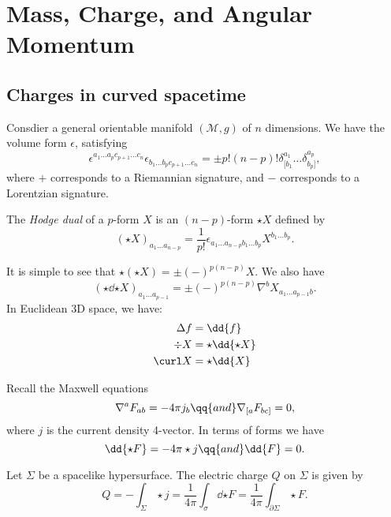 \documentclass{jknotes}
\begin{document}
\section{Mass, Charge, and Angular Momentum}
\subsection{Charges in curved spacetime}
Consdier a general orientable manifold \((\mathcal{M},g)\) of \(n\) dimensions. We have the volume form \(\epsilon\), satisfying
\begin{equation}
    \epsilon^{a_1\dots a_p c_{p+1} \dots c_n}\epsilon_{b_1\dots b_p c_{p+1} \dots c_n}
    = \pm p!(n-p)! \delta^{a_1}_{[b_1} \dots \delta^{a_p}_{b_p]},
\end{equation}
where \(+\) corresponds to a Riemannian signature, and \(-\) corresponds to a Lorentzian signature.
\begin{defn}
    The \emph{Hodge dual} of a \(p\)-form \(X\) is an \((n-p)\)-form \(\star X\) defined by
    \begin{equation}
        (\star X)_{a_1\dots a_{n-p}} = \frac{1}{p!}\epsilon_{a_1\dots a_{n-p} b_1\dots b_p} X^{b_1\dots b_p}.
    \end{equation}
\end{defn}
It is simple to see that \(\star(\star X) = \pm (-)^{p(n-p)}X\). We also have 
\begin{equation}
    (\star \dd{\star X})_{a_1\dots a_{p-1}} = \pm (-)^{p(n-p)} \nabla^b X_{a_1\dots a_{p-1} b}.
\end{equation}
In Euclidean 3D space, we have:
\begin{align}
    \Delta f &= \dd{f} \\
    \div X &= \star\dd{\star X} \\
    \curl X &= \star\dd{X}
\end{align}

Recall the Maxwell equations
\begin{equation}
    \nabla^aF_{ab} = -4\pi j_b \qq{and} \nabla_{[a}F_{bc]} = 0,
\end{equation}
where \(j\) is the current density 4-vector. In terms of forms we have
\begin{equation}
    \dd{\star F} = -4\pi \star j \qq{and} \dd{F} = 0.
\end{equation}

\begin{defn}
    Let \(\Sigma\) be a spacelike hypersurface. The electric charge \(Q\) on \(\Sigma\) is given by
    \begin{equation}
        Q = -\int_\Sigma \star j = \frac{1}{4\pi}\int_\sigma \dd{\star F} = \frac{1}{4\pi} \int_{\partial\Sigma}\star F.
    \end{equation}
\end{defn}
\end{document}
